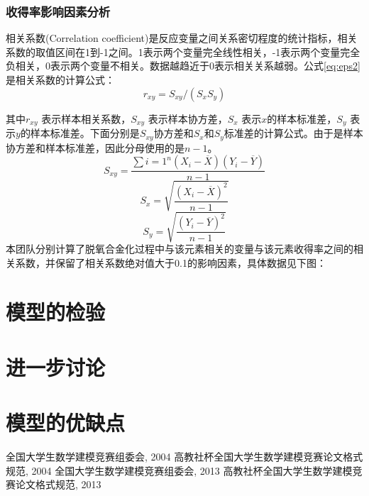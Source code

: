 \documentclass{xcumcmart}
\begin{document}
\subsubsection{收得率影响因素分析}
相关系数(Correlation coefficient)是反应变量之间关系密切程度的统计指标，相关系数的取值区间在1到-1之间。1表示两个变量完全线性相关，-1表示两个变量完全负相关，0表示两个变量不相关。数据越趋近于0表示相关关系越弱。公式\ref{eq:eps2}是相关系数的计算公式：
\begin{equation} \label{eq:eps2}
    r_{xy}=S_{xy}/(S_xS_y )
\end{equation}

其中$r_{xy}$ 表示样本相关系数，$S_{xy}$ 表示样本协方差，$S_x$ 表示$x$的样本标准差，$S_y$  表示$y$的样本标准差。下面分别是$S_{xy}$协方差和$S_x$和$S_y$标准差的计算公式。由于是样本协方差和样本标准差，因此分母使用的是$n-1$。
\[S_{xy}=\frac{\sum{i=1}^n(X_i-\overline{X})(Y_i-\overline{Y})}{n-1}\]
\[S_x=\sqrt{\frac{(X_i-\overline{X})^2}{n-1}}\]
\[S_y=\sqrt{\frac{(Y_i-\overline{Y})^2}{n-1}}\]
本团队分别计算了脱氧合金化过程中与该元素相关的变量与该元素收得率之间的相关系数，并保留了相关系数绝对值大于0.1的影响因素，具体数据见下图：

\section{模型的检验}
\section{进一步讨论}
\section{模型的优缺点}

\begin{thebibliography}{1}
 全国大学生数学建模竞赛组委会, 2004 高教社杯全国大学生数学建模竞赛论文格式规范, 2004
 全国大学生数学建模竞赛组委会, 2013 高教社杯全国大学生数学建模竞赛论文格式规范, 2013
\end{thebibliography}
\end{document}
